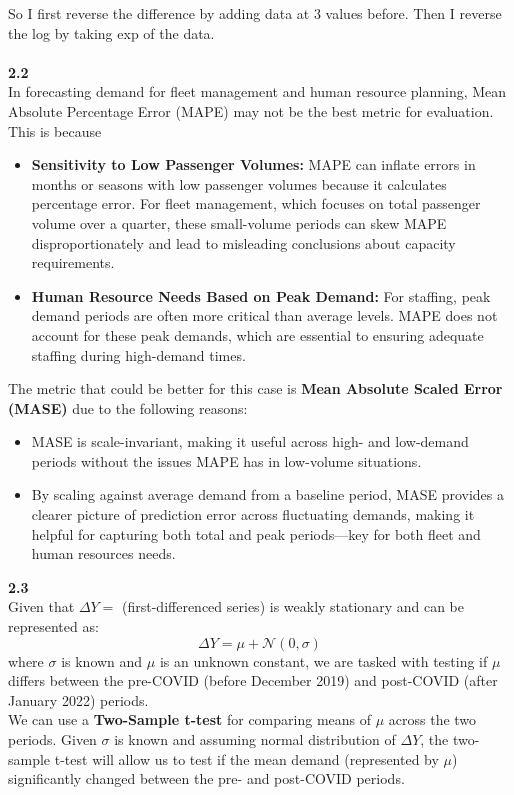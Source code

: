 So I first reverse the difference by adding data at 3 values before. Then I reverse the log by taking exp of the data. \\
\\
\textbf{2.2} \\
In forecasting demand for fleet management and human resource planning, Mean Absolute Percentage Error (MAPE) may not be the best metric for evaluation. This is because
\begin{itemize}
    \item \textbf{Sensitivity to Low Passenger Volumes:}  MAPE can inflate errors in months or seasons with low passenger volumes because it calculates percentage error. For fleet management, which focuses on total passenger volume over a quarter, these small-volume periods can skew MAPE disproportionately and lead to misleading conclusions about capacity requirements.
    \item \textbf{Human Resource Needs Based on Peak Demand:} For staffing, peak demand periods are often more critical than average levels. MAPE does not account for these peak demands, which are essential to ensuring adequate staffing during high-demand times.
\end{itemize}

The metric that could be better for this case is \textbf{Mean Absolute Scaled Error (MASE)} due to the following reasons:
\begin{itemize}
    \item MASE is scale-invariant, making it useful across high- and low-demand periods without the issues MAPE has in low-volume situations.
    \item By scaling against average demand from a baseline period, MASE provides a clearer picture of prediction error across fluctuating demands, making it helpful for capturing both total and peak periods—key for both fleet and human resources needs.
\end{itemize}
\textbf{2.3}\\
Given that $\Delta Y= $ (first-differenced series) is weakly stationary and can be represented as:
\begin{equation}
    \Delta Y = \mu + \mathcal{N}(0,\sigma)
\end{equation}
where $\sigma$ is known and $\mu$ is an unknown constant, we are tasked with testing if $\mu$ differs between the pre-COVID (before December 2019) and post-COVID (after January 2022) periods. 
\\
We can use a \textbf{Two-Sample t-test} for comparing means of $\mu$ across the two periods. Given $\sigma$ is known and assuming normal distribution of $\Delta Y$, the two-sample t-test will allow us to test if the mean demand (represented by $\mu$) significantly changed between the pre- and post-COVID periods.

